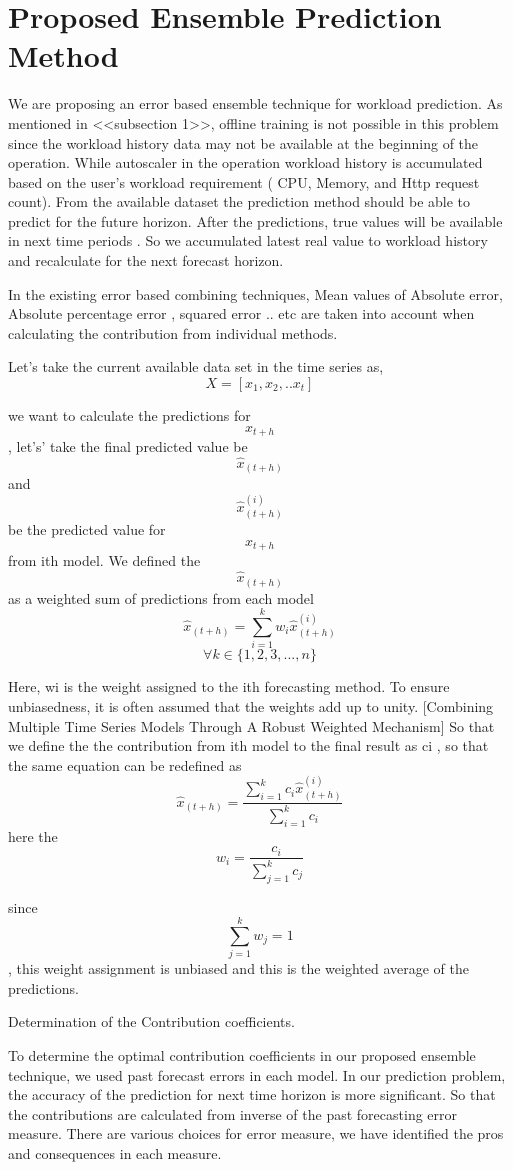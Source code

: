 \section{Proposed Ensemble Prediction Method}

We are proposing an error based ensemble technique for workload prediction. As mentioned in <<subsection 1>>, 
offline training is not possible in this problem since the  workload history data may not be available at the 
beginning of the operation. While autoscaler in the operation workload history  is accumulated based on the user's 
workload requirement ( CPU, Memory, and Http request count). From the available dataset the prediction method 
should be able to predict for the future horizon. After the predictions, true values will be available in next time 
periods . So we accumulated latest real value to workload history and recalculate for the next forecast horizon. 
        
    In the existing error based combining techniques, Mean values of Absolute error, Absolute percentage error , 
squared error .. etc are taken into account when calculating the contribution from individual methods. 

Let's take the current available data set in the time series as, $$X=[x_{1},x_{2},.. x_{t}]$$  

we want to calculate the predictions for  $$x_{t+h}$$ , let's’ take the final predicted value be $$\hat{x}_{(t+h)}$$ and $$\hat{x}_{(t+h)}^{(i)}$$ be the predicted value for $$x_{t+h}$$ from ith model. We defined the $$\hat{x}_{(t+h)}$$ as a weighted sum of predictions from each model
 $$\hat{x}_{(t+h)}= \sum_{i=1}^{k}w_i \hat{x}_{(t+h)}^{(i)}$$   $$\forall k \in \{1,2,3,...,n\}$$ 

Here, wi is the weight assigned to the ith forecasting method. To ensure unbiasedness, it is often assumed that the weights add up to unity. [Combining Multiple Time Series Models Through A Robust Weighted Mechanism]
So that we define the the contribution from ith model to the final result as ci , so that the same equation can be redefined as  
$$\hat{x}_{(t+h)}= \frac{\sum_{i=1}^{k}c_i \hat{x}_{(t+h)}^{(i)}}{\sum_{i=1}^{k}c_i}$$  here the   $$w_{i}= \frac{c_{i}}{\sum_{j=1}^{k}c_j}$$  

since   $$\sum_{j=1}^{k}w_{j}=1$$ , this weight assignment is unbiased and this is the weighted average of the predictions.


Determination of the Contribution coefficients.

To determine the optimal contribution coefficients in our proposed ensemble technique,  we used past forecast errors in each model. In our prediction problem, the accuracy of the prediction for next time horizon is more significant. So that the  contributions are calculated from inverse of the past forecasting error measure. There are various choices for error measure,  we have identified the pros and consequences in each measure. 


